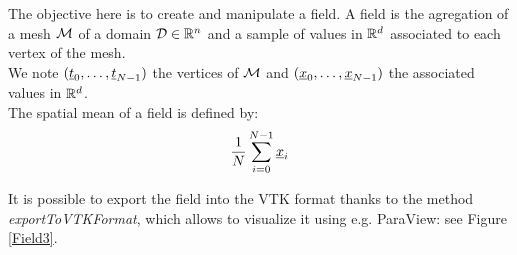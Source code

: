 \renewcommand{\filename}{docUC_StochProc_Field.tex}
\renewcommand{\filetitle}{UC : Manipulation of a field}

\HeaderIILevel

\label{UCField}




The objective here is to create and manipulate a field. A field is the agregation of a mesh ${\mathcal M}$ of a domain ${\mathcal D} \in {\mathbb R}^n$ and a sample of values in ${\mathbb R}^d$ associated to each vertex of the mesh. \\

We note $({\underline{t}}_0, \dots, {\underline{t}}_{N-1})$ the vertices of ${\mathcal M}$ and $({\underline{x}}_0, \dots, {\underline{x}}_{N-1})$ the associated values in ${\mathbb R}^d$.\\

The spatial mean of a field is  defined by:
\begin{align}\label{spatMeanField}
  \displaystyle \frac{1}{N} \sum_{i=0}^{N-1} {\underline{x}}_i
\end{align}




It is possible to export the field into the VTK format thanks to the method \emph{exportToVTKFormat}, which allows to visualize it using e.g. ParaView: see Figure \ref{Field3}.\\

